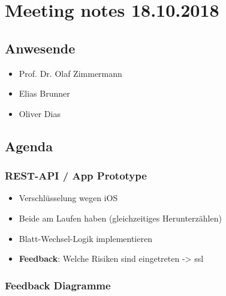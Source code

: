 \hypertarget{meeting-notes-18.10.2018}{%
\section*{Meeting notes 18.10.2018}\label{meeting-notes-18.10.2018}}

\hypertarget{anwesende}{%
\subsection*{Anwesende}\label{anwesende}}

\begin{itemize}

\item
  Prof. Dr. Olaf Zimmermann
\item
  Elias Brunner
\item
  Oliver Dias
\end{itemize}

\hypertarget{agenda}{%
\subsection*{Agenda}\label{agenda}}

\hypertarget{rest-api-ux2f-app-prototype}{%
\subsubsection*{REST-API / App
Prototype}\label{rest-api-ux2f-app-prototype}}

\begin{itemize}

\item
  Verschlüsselung wegen iOS
\item
  Beide am Laufen haben (gleichzeitiges Herunterzählen)
\item
  \grqq Blatt-Wechsel-Logik\grqq{} implementieren
  
\item
  \textbf{Feedback}: Welche Risiken sind eingetreten -\textgreater{} ssl
\end{itemize}

\hypertarget{feedback-diagramme}{%
\subsubsection*{Feedback Diagramme}\label{feedback-diagramme}}

